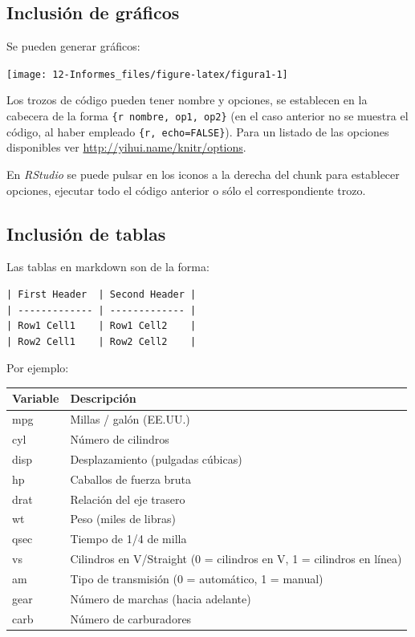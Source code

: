 \documentclass[]{book}
\begin{document}
\subsection{Inclusión de gráficos}\label{inclusion-de-graficos}

Se pueden generar gráficos:

\begin{center}\texttt{[image: 12-Informes\_files/figure-latex/figura1-1]} \end{center}

Los trozos de código pueden tener nombre y opciones, se establecen en la
cabecera de la forma
\texttt{\textasciigrave{}\textasciigrave{}\textasciigrave{}\{r\ nombre,\ op1,\ op2\}}
(en el caso anterior no se muestra el código, al haber empleado
\texttt{\textasciigrave{}\textasciigrave{}\textasciigrave{}\{r,\ echo=FALSE\}}).
Para un listado de las opciones disponibles ver
\url{http://yihui.name/knitr/options}.

En \emph{RStudio} se puede pulsar en los iconos a la derecha del chunk
para establecer opciones, ejecutar todo el código anterior o sólo el
correspondiente trozo.

\subsection{Inclusión de tablas}\label{inclusion-de-tablas}

Las tablas en markdown son de la forma:

\begin{verbatim}
| First Header  | Second Header |
| ------------- | ------------- |
| Row1 Cell1    | Row1 Cell2    |
| Row2 Cell1    | Row2 Cell2    |
\end{verbatim}

Por ejemplo:

\begin{longtable}[]{@{}ll@{}}
\toprule
Variable & Descripción\tabularnewline
\midrule
\endhead
mpg & Millas / galón (EE.UU.)\tabularnewline
cyl & Número de cilindros\tabularnewline
disp & Desplazamiento (pulgadas cúbicas)\tabularnewline
hp & Caballos de fuerza bruta\tabularnewline
drat & Relación del eje trasero\tabularnewline
wt & Peso (miles de libras)\tabularnewline
qsec & Tiempo de 1/4 de milla\tabularnewline
vs & Cilindros en V/Straight (0 = cilindros en V, 1 = cilindros en
línea)\tabularnewline
am & Tipo de transmisión (0 = automático, 1 = manual)\tabularnewline
gear & Número de marchas (hacia adelante)\tabularnewline
carb & Número de carburadores\tabularnewline
\bottomrule
\end{longtable}
\end{document}
